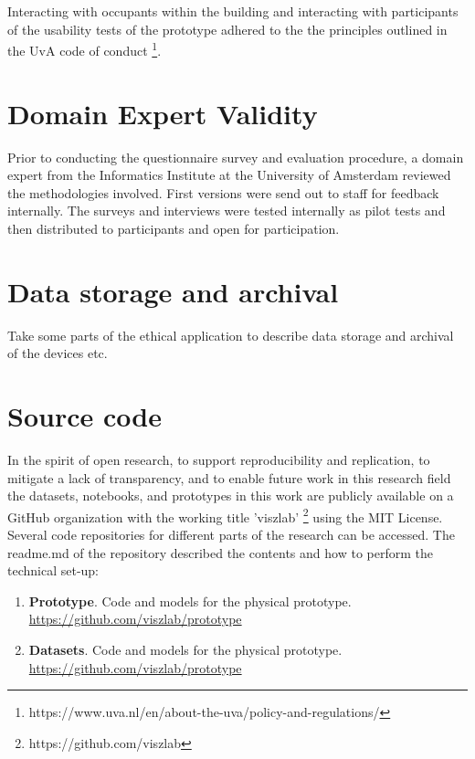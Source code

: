 \begin{appendices}
Interacting with occupants within the building and interacting with participants of the usability tests of the prototype adhered to the the principles outlined in the UvA code of conduct \footnote{https://www.uva.nl/en/about-the-uva/policy-and-regulations/}.

\section{Domain Expert Validity}
\label{sec:apx:first_appendix}

Prior to conducting the questionnaire survey and evaluation procedure, a domain expert from the Informatics Institute at the University of Amsterdam reviewed the methodologies involved. First versions were send out to staff for feedback internally. The surveys and interviews were tested internally as pilot tests and then distributed to participants and open for participation. 

\section{Data storage and archival}
\label{sec:apx:first_appendix}

Take some parts of the ethical application to describe data storage and archival of the devices etc.

\section{Source code}

In the spirit of open research, to support reproducibility and replication, to mitigate a lack of transparency, and to enable future work in this research field the datasets, notebooks, and prototypes in this work are publicly available on a GitHub organization with the working title 'viszlab' \footnote{https://github.com/viszlab} using the MIT License. Several code repositories for different parts of the research can be accessed. The readme.md of the repository described the contents and how to perform the technical set-up:

\begin{enumerate}
  \item \textbf{Prototype}. Code and models for the physical prototype.\\
  \underline{https://github.com/viszlab/prototype}
  \item \textbf{Datasets}. Code and models for the physical prototype.\\
  \underline{https://github.com/viszlab/prototype}
\end{enumerate}


\end{appendices}
